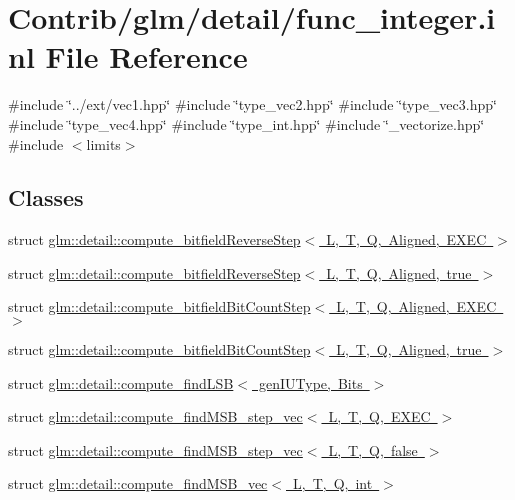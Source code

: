 \hypertarget{func__integer_8inl}{}\section{Contrib/glm/detail/func\+\_\+integer.inl File Reference}
\label{func__integer_8inl}
{\ttfamily \#include \char`\"{}../ext/vec1.\+hpp\char`\"{}}\newline
{\ttfamily \#include \char`\"{}type\+\_\+vec2.\+hpp\char`\"{}}\newline
{\ttfamily \#include \char`\"{}type\+\_\+vec3.\+hpp\char`\"{}}\newline
{\ttfamily \#include \char`\"{}type\+\_\+vec4.\+hpp\char`\"{}}\newline
{\ttfamily \#include \char`\"{}type\+\_\+int.\+hpp\char`\"{}}\newline
{\ttfamily \#include \char`\"{}\+\_\+vectorize.\+hpp\char`\"{}}\newline
{\ttfamily \#include $<$limits$>$}\newline
\subsection*{Classes}
\begin{DoxyCompactItemize}
\item 
struct \mbox{\hyperlink{structglm_1_1detail_1_1compute__bitfield_reverse_step}{glm\+::detail\+::compute\+\_\+bitfield\+Reverse\+Step$<$ L, T, Q, Aligned, E\+X\+E\+C $>$}}
\item 
struct \mbox{\hyperlink{structglm_1_1detail_1_1compute__bitfield_reverse_step_3_01_l_00_01_t_00_01_q_00_01_aligned_00_01true_01_4}{glm\+::detail\+::compute\+\_\+bitfield\+Reverse\+Step$<$ L, T, Q, Aligned, true $>$}}
\item 
struct \mbox{\hyperlink{structglm_1_1detail_1_1compute__bitfield_bit_count_step}{glm\+::detail\+::compute\+\_\+bitfield\+Bit\+Count\+Step$<$ L, T, Q, Aligned, E\+X\+E\+C $>$}}
\item 
struct \mbox{\hyperlink{structglm_1_1detail_1_1compute__bitfield_bit_count_step_3_01_l_00_01_t_00_01_q_00_01_aligned_00_01true_01_4}{glm\+::detail\+::compute\+\_\+bitfield\+Bit\+Count\+Step$<$ L, T, Q, Aligned, true $>$}}
\item 
struct \mbox{\hyperlink{structglm_1_1detail_1_1compute__find_l_s_b}{glm\+::detail\+::compute\+\_\+find\+L\+S\+B$<$ gen\+I\+U\+Type, Bits $>$}}
\item 
struct \mbox{\hyperlink{structglm_1_1detail_1_1compute__find_m_s_b__step__vec}{glm\+::detail\+::compute\+\_\+find\+M\+S\+B\+\_\+step\+\_\+vec$<$ L, T, Q, E\+X\+E\+C $>$}}
\item 
struct \mbox{\hyperlink{structglm_1_1detail_1_1compute__find_m_s_b__step__vec_3_01_l_00_01_t_00_01_q_00_01false_01_4}{glm\+::detail\+::compute\+\_\+find\+M\+S\+B\+\_\+step\+\_\+vec$<$ L, T, Q, false $>$}}
\item 
struct \mbox{\hyperlink{structglm_1_1detail_1_1compute__find_m_s_b__vec}{glm\+::detail\+::compute\+\_\+find\+M\+S\+B\+\_\+vec$<$ L, T, Q, int $>$}}
\end{DoxyCompactItemize}
